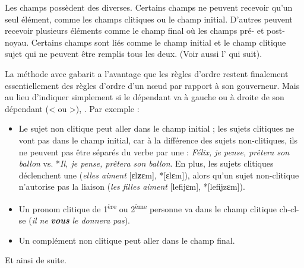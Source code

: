 \begin{sloppypar} Les champs possèdent des  diverses. Certains champs ne peuvent recevoir qu’un seul élément, comme les champs clitiques ou le champ initial. D’autres peuvent recevoir plusieurs éléments comme le champ final où les champs pré- et post-noyau. Certains champs sont liés comme le champ initial et le champ clitique sujet qui ne peuvent être remplis tous les deux. (Voir aussi l’ qui suit).
\end{sloppypar}

La méthode avec gabarit a l’avantage que les règles d’ordre restent finalement essentiellement des règles d’ordre d’un nœud par rapport à son gouverneur. Mais au lieu d’indiquer simplement si le dépendant va à gauche ou à droite de son dépendant (< ou >),  . Par exemple :

\begin{itemize}
\item Le sujet non clitique peut aller dans le champ initial ; les sujets clitiques ne vont pas dans le champ initial, car à la différence des sujets non-clitiques, ils ne peuvent pas être séparés du verbe par une  : \textit{Félix, je pense, prêtera son ballon} vs. *\textit{Il, je pense, prêtera son ballon}. En plus, les sujets clitiques déclenchent une  (\textit{elles aiment} [ɛl\textbf{z}ɛm], *[ɛlɛm]), alors qu'un sujet non-clitique n'autorise pas la liaison (\textit{les filles aiment} [lefijɛm], *[lefijzɛm]).
\item Un pronom clitique de 1\textsuperscript{ère} ou 2\textsuperscript{ème} personne va dans le champ clitique ch-cl-se (\textit{il ne} \textbf{\textit{vous}} \textit{le donnera pas}).
\item Un complément non clitique peut aller dans le champ final.
\end{itemize}

Et ainsi de suite.

